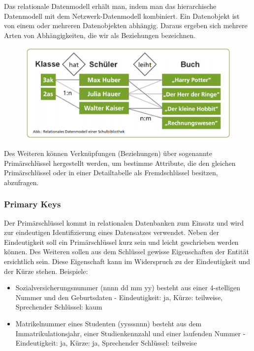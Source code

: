 Das relationale Datenmodell erhält man, indem man das hierarchische Datenmodell mit dem Netzwerk-Datenmodell kombiniert. Ein Datenobjekt ist von einem oder mehreren Datenobjekten abhängig. Daraus ergeben sich mehrere Arten von Abhängigkeiten, die wir als Beziehungen bezeichnen.

\begin{figure}[H]
    \centering
    \includegraphics[width=.8\textwidth]{Content/images/modellierung/biblio.png}
    \caption{}
    \label{fig:modellierung:biblio}
\end{figure}

Des Weiteren können Verknüpfungen (Beziehungen) über sogenannte Primärschlüssel hergestellt werden, um bestimme Attribute, die den gleichen Primärschlüssel oder in einer Detailtabelle als Fremdschlüssel besitzen, abzufragen.

\subsubsection{Primary Keys}

Der Primärschlüssel kommt in relationalen Datenbanken zum Einsatz und wird zur eindeutigen Identifizierung eines Datensatzes verwendet. Neben der Eindeutigkeit soll ein Primärschlüssel kurz sein und leicht geschrieben werden können. Des Weiteren sollen aus dem Schlüssel gewisse Eigenschaften der Entität ersichtlich sein. Diese Eigenschaft kann im Widerspruch zu der Eindeutigkeit und der Kürze stehen. 
Beispiele:
\begin{itemize}
    \item Sozialversicherungsnummer (nnnn dd mm yy) besteht aus einer 4-stelligen Nummer und den Geburtsdaten - Eindeutigkeit: ja, Kürze: teilweise, Sprechender Schlüssel: kaum
    \item Matrikelnummer eines Studenten (yysssnnn) besteht aus dem Immatrikulationsjahr, einer Studienkennzahl und einer laufenden Nummer - Eindeutigkeit: ja, Kürze: ja, Sprechender Schlüssel: teilweise
\end{itemize}

